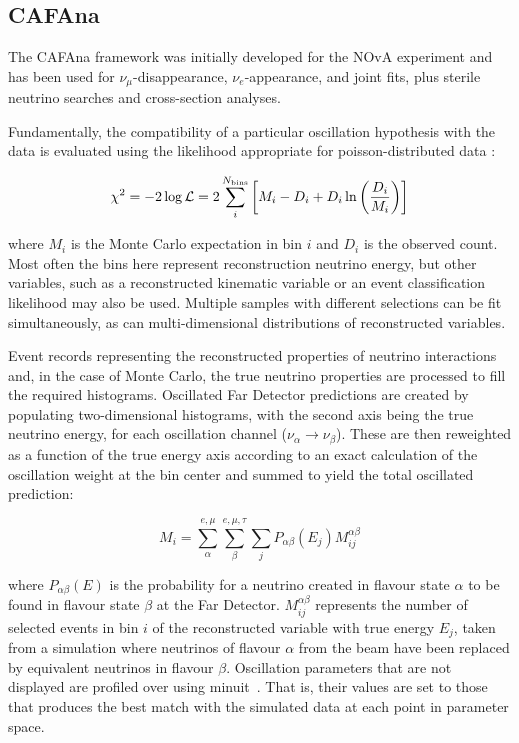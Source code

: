 \subsection{CAFAna}
\label{sect:methods-cafana}

The CAFAna framework was initially developed for the NOvA experiment and has been used for $\nu_\mu$-disappearance, $\nu_e$-appearance, and joint fits, plus sterile neutrino searches and cross-section analyses.

Fundamentally, the compatibility of a particular oscillation hypothesis with the data is evaluated using the likelihood appropriate for poisson-distributed data \cite{PDG}:

\begin{equation}
    \chi^2 = -2\log\mathcal{L} = 2\sum_i^{N_{\rm bins}}\left[ M_i-D_i+D_i\ln\left({D_i\over M_i}\right) \right]
\end{equation}

where $M_i$ is the Monte Carlo expectation in bin $i$ and $D_i$ is the observed count. Most often the bins here represent reconstruction neutrino energy, but other variables, such as a reconstructed kinematic variable or an event classification likelihood may also be used. Multiple samples with different selections can be fit simultaneously, as can multi-dimensional distributions of reconstructed variables.

Event records representing the reconstructed properties of neutrino interactions and, in the case of Monte Carlo, the true neutrino properties are processed to fill the required histograms. Oscillated Far Detector predictions are created by populating two-dimensional histograms, with the second axis being the true neutrino energy, for each oscillation channel ($\nu_\alpha\to\nu_\beta$). These are then reweighted as a function of the true energy axis according to an exact calculation of the oscillation weight at the bin center %
and summed to yield the total oscillated prediction:

\begin{equation}
    M_i = \sum_\alpha^{e,\mu}\sum_\beta^{e,\mu,\tau}\sum_j P_{\alpha\beta}(E_j)M_{ij}^{\alpha\beta}
    \label{eqn:cafana_ll}
\end{equation}

where $P_{\alpha\beta}(E)$ is the probability for a neutrino created in flavour state $\alpha$ to be found in flavour state $\beta$ at the Far Detector. $M_{ij}^{\alpha\beta}$ represents the number of selected events in bin $i$ of the reconstructed variable with true energy $E_j$, taken from a simulation where neutrinos of flavour $\alpha$ from the beam have been replaced by equivalent neutrinos in flavour $\beta$. Oscillation parameters that are not displayed are profiled over using {\sc minuit}~\cite{James:1994vla}. That is, their values are set to those that produces the best match with the simulated data at each point in parameter space.

